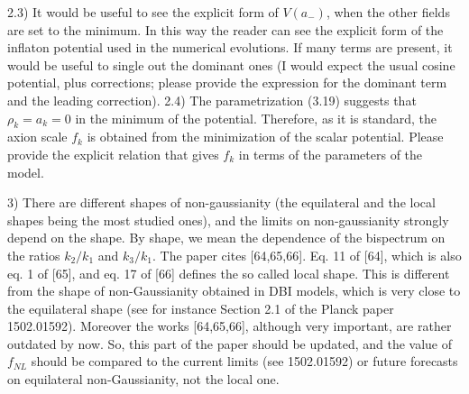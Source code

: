 \documentclass[a4paper,11pt]{article}
\begin{document}
{2.3) It would be useful to see the explicit form of $V (a_-)$, when the other fields are set to the minimum. In this way the reader can see the explicit form of the inflaton potential used in the numerical evolutions. If many terms are present, it would be useful to single out the dominant ones (I would expect the usual cosine potential, plus corrections; please provide the expression for the dominant term and the leading correction).
2.4) The parametrization (3.19) suggests that $\rho_k = a_k = 0$ in the minimum of the potential. Therefore, as it is standard, the axion scale 
$f_k$ is obtained from the minimization of the scalar potential. Please provide the explicit relation that gives $f_k$ in terms of the parameters of the model.\\

3) There are different shapes of non-gaussianity (the equilateral and the local shapes being the most studied ones), and the limits on non-gaussianity strongly depend on the shape. By shape, we mean the dependence of the bispectrum on the ratios $k_2/k_1$ and
$k_3/k_1$. The paper cites [64,65,66]. Eq. 11 of [64], which is also eq. 1 of [65], and eq. 17 of [66] defines the so called local shape. This is different from the shape of non-Gaussianity obtained in DBI models, which is very close to the equilateral shape (see for instance Section 2.1 of the Planck paper 1502.01592). Moreover the works [64,65,66], although very important, are rather outdated by now. So, this part of the paper should be updated, and the value of $f_{NL}$ should be compared to the current limits (see 1502.01592) or future forecasts on equilateral non-Gaussianity, not the local one.

}
\end{document}
